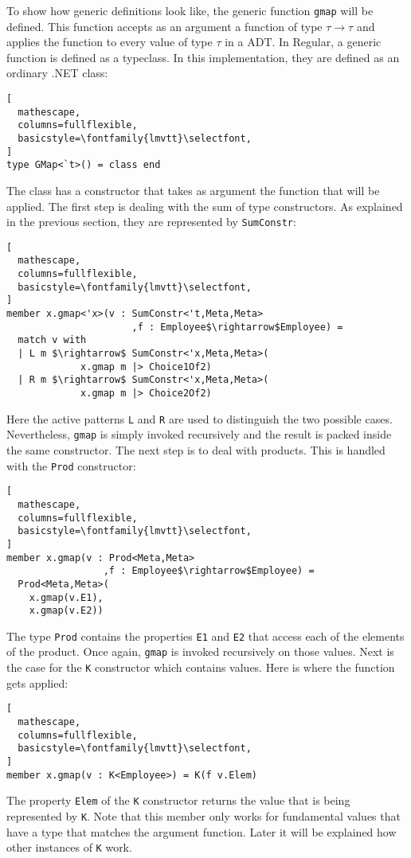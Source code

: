 \documentclass{sigplanconf}
\begin{document}
To show how generic definitions look like, the generic function
\verb+gmap+ will be defined. This function accepts as an argument a
function of type $\tau\to\tau$ and applies the function to every value
of type $\tau$ in a ADT. In Regular, a generic function is defined as
a typeclass. In this implementation, they are defined as an ordinary
.NET class:
\begin{lstlisting}[
  mathescape,
  columns=fullflexible,
  basicstyle=\fontfamily{lmvtt}\selectfont,
]
type GMap<`t>() = class end
\end{lstlisting}
The class has a constructor that takes as argument the function that
will be applied. The first step is dealing with the sum of type
constructors. As explained in the previous section, they are
represented by \verb+SumConstr+:
\begin{lstlisting}[
  mathescape,
  columns=fullflexible,
  basicstyle=\fontfamily{lmvtt}\selectfont,
]
member x.gmap<'x>(v : SumConstr<'t,Meta,Meta>
                      ,f : Employee$\rightarrow$Employee) =
  match v with
  | L m $\rightarrow$ SumConstr<'x,Meta,Meta>(
             x.gmap m |> Choice1Of2)
  | R m $\rightarrow$ SumConstr<'x,Meta,Meta>(
             x.gmap m |> Choice2Of2)
\end{lstlisting}
Here the active patterns \verb+L+ and \verb+R+ are used to distinguish
the two possible cases. Nevertheless, \verb+gmap+ is simply invoked
recursively and the result is packed inside the same constructor. The
next step is to deal with products. This is handled with the
\verb+Prod+ constructor:
\begin{lstlisting}[
  mathescape,
  columns=fullflexible,
  basicstyle=\fontfamily{lmvtt}\selectfont,
]
member x.gmap(v : Prod<Meta,Meta>
                 ,f : Employee$\rightarrow$Employee) =
  Prod<Meta,Meta>(
    x.gmap(v.E1),
    x.gmap(v.E2))
\end{lstlisting}
The type \verb+Prod+ contains the properties \verb+E1+ and \verb+E2+
that access each of the elements of the product. Once again,
\verb+gmap+ is invoked recursively on those values. Next is the case
for the \verb+K+ constructor which contains values. Here is where the
function gets applied:
\begin{lstlisting}[
  mathescape,
  columns=fullflexible,
  basicstyle=\fontfamily{lmvtt}\selectfont,
]
member x.gmap(v : K<Employee>) = K(f v.Elem)
\end{lstlisting}
The property \verb+Elem+ of the \verb+K+ constructor returns the value
that is being represented by \verb+K+. Note that this member only
works for fundamental values that have a type that matches the
argument function. Later it will be explained how other instances of
\verb+K+ work.
\end{document}
